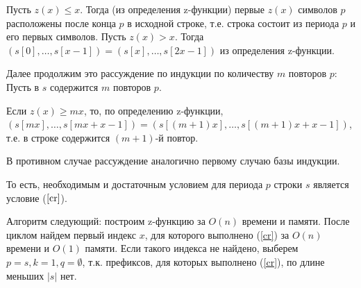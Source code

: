 \documentclass{article}
\begin{document}
Пусть $z(x)\leq x$. Тогда (из определения z-функции) первые $z(x)$ символов $p$ расположены после конца $p$ в исходной строке, т.е. строка состоит из периода $p$ и его первых символов.
Пусть $z(x)>x$. Тогда $(s[0],\dots,s[x-1])=(s[x],\dots,s[2x-1])$ из определения z-функции.

Далее продолжим это рассуждение по индукции по количеству $m$ повторов $p$: Пусть в $s$ содержится $m$ повторов $p$.

Если $z(x)\geq mx$, то, по определению z-функции, $(s[mx],\dots,s[mx+x-1])=(s[(m+1)x],\dots,s[(m+1)x+x-1])$, т.е. в строке содержится $(m+1)$-й повтор.

В противном случае рассуждение аналогично первому случаю базы индукции.

То есть, необходимым и достаточным условием для периода $p$ строки $s$ является условие ($\ref{cr}$).

Алгоритм следующий: построим z-функцию за $O(n)$ времени и памяти. После циклом найдем первый индекс $x$, для которого выполнено (\ref{cr}) за $O(n)$ времени и $O(1)$ памяти. Если такого индекса не найдено, выберем $p=s, k=1, q=\emptyset$, т.к. префиксов, для которых выполнено (\ref{cr}), по длине меньших $|s|$ нет.
\end{document}

